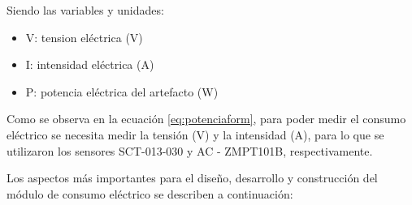 \vspace{0.2cm}
Siendo las variables y unidades:
\begin{itemize}
\item V: tension eléctrica (V)
\item I: intensidad eléctrica (A)
\item P: potencia eléctrica del artefacto (W)
\end{itemize}


Como se observa en la ecuación \ref{eq:potenciaform}, para poder medir el consumo eléctrico se necesita medir la tensión (V) y la intensidad (A), para lo que se utilizaron los sensores SCT-013-030 y  AC - ZMPT101B, respectivamente.

Los aspectos más importantes para el diseño, desarrollo y construcción del módulo de consumo eléctrico se describen  a continuación:


